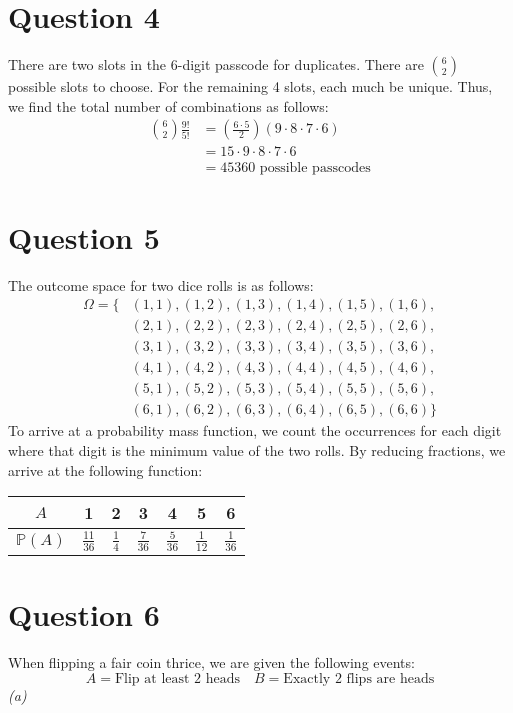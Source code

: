 \documentclass[titlepage, 12pt, leqno]{article}
\begin{document}
\pagebreak
\section{Question 4}
There are two slots in the 6-digit passcode for duplicates. There are $\binom{6}{2}$ possible slots to choose. For the remaining 4 slots, each much be unique. Thus, we find the total number of combinations as follows:
\begin{align*}
    \binom{6}{2} \frac{9!}{5!} &= \left(\frac{6 \cdot 5}{2}\right) \left(9 \cdot 8 \cdot 7 \cdot 6\right) \\
                               &= 15 \cdot 9 \cdot 8 \cdot 7 \cdot 6 \\
                               &= \boxed{45360 \text{ possible passcodes}} 
\end{align*}

\pagebreak
\section{Question 5}
The outcome space for two dice rolls is as follows:
\begin{align*}
    \Omega = \{&(1,1), (1,2), (1,3), (1,4), (1,5), (1,6), \\
           &(2,1), (2,2), (2,3), (2,4), (2,5), (2,6), \\
           &(3,1), (3,2), (3,3), (3,4), (3,5), (3,6), \\
           &(4,1), (4,2), (4,3), (4,4), (4,5), (4,6), \\
           &(5,1), (5,2), (5,3), (5,4), (5,5), (5,6), \\
           &(6,1), (6,2), (6,3), (6,4), (6,5), (6,6) \}
\end{align*}
To arrive at a probability mass function, we count the occurrences for each digit where that digit is the minimum value of the two rolls. By reducing fractions, we arrive at the following function:
\renewcommand{\arraystretch}{1.5}
\begin{center}
    \begin{tabular}{ c|c|c|c|c|c|c| }
        $A$ & 1 & 2 & 3 & 4 & 5 & 6 \\
        \hline
        $\mathbb{P}(A)$ & $\frac{11}{36}$ & $\frac{1}{4}$ & $\frac{7}{36}$ & $\frac{5}{36}$ & $\frac{1}{12}$ & $\frac{1}{36}$ 
    \end{tabular}
\end{center}

\pagebreak
\section{Question 6}
When flipping a fair coin thrice, we are given the following events:
\[
    A = \text{Flip at least 2 heads} \quad B = \text{Exactly 2 flips are heads}
\]
\textit{(a)}
\end{document}
